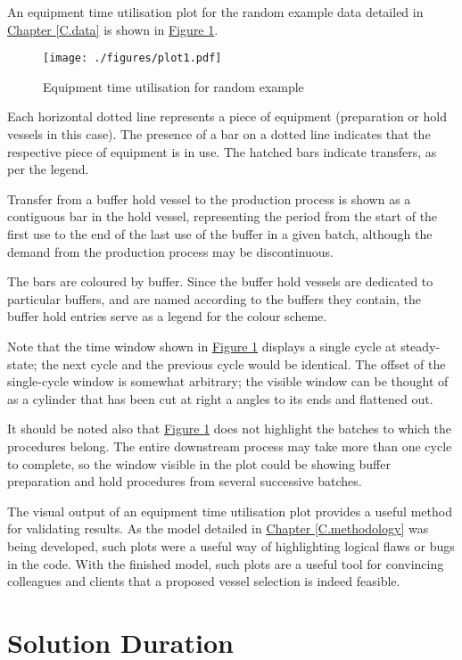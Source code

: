 An equipment time utilisation plot for the random example data detailed in
\hyperref[C.data]{Chapter \ref*{C.data}} is shown in
\hyperref[fig.etu1]{Figure \ref*{fig.etu1}}.
\begin{figure}
    \centering
    \texttt{[image: ./figures/plot1.pdf]}
    \caption{Equipment time utilisation for random example}
    \label{fig.etu1}
\end{figure}
Each horizontal dotted line represents a piece of equipment (preparation or
hold vessels in this case).
The presence of a bar on a dotted line indicates that the respective piece of
equipment is in use.  
The hatched bars indicate transfers, as per the legend.

Transfer from a buffer hold vessel to the production process is shown as a
contiguous bar in the hold vessel, representing the
period from the start of the first use to the end of the last use of the buffer
in a given batch, although the demand from the production process may be
discontinuous.

The bars are coloured by buffer. Since the buffer hold vessels are dedicated
to particular buffers, and are named according to the buffers they contain,
the buffer hold entries serve as a legend for the colour scheme.

Note that the time window shown in \hyperref[fig.etu1]{Figure \ref*{fig.etu1}}
displays a single cycle at steady-state; the next cycle and the previous cycle
would be identical.
The offset of the single-cycle window is somewhat arbitrary; the
visible window can be thought of as a cylinder that has been cut at right a
angles to its ends and flattened out.

It should be noted also that \hyperref[fig.etu1]{Figure \ref*{fig.etu1}}
does not highlight the batches to which the procedures belong.
The entire downstream process may take more than one cycle to complete, so the
window visible in the plot could be showing buffer preparation and hold
procedures from several successive batches.

The visual output of an equipment time utilisation plot provides a useful
method for validating results.
As the model detailed in 
\hyperref[C.methodology]{Chapter \ref*{C.methodology}} was being developed,
such plots were a useful way of highlighting logical flaws or bugs in the code.
With the finished model, such plots are a useful tool for convincing
colleagues and clients that a proposed vessel selection is indeed feasible.

\section{Solution Duration}\label{S.soltime}
